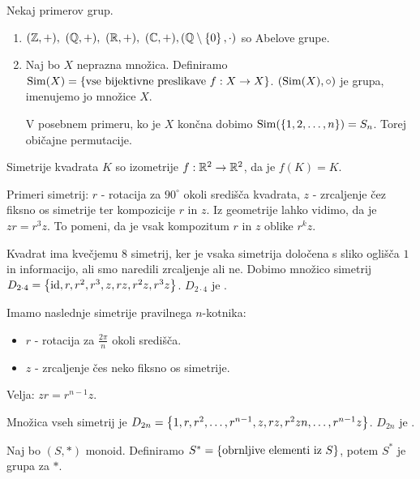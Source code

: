 \begin{zgled}
    Nekaj primerov grup.
    \begin{enumerate}
        \item $(\mathbb{Z}, +), \ (\mathbb{Q}, +), \ (\mathbb{R}, +), \ (\mathbb{C}, +), (\mathbb{Q} \setminus \left\{0\right\}, \cdot)$ so Abelove grupe.
        \item Naj bo $X$ neprazna množica. Definiramo $\operatorname{Sim}(X) = \left\{\text{vse bijektivne preslikave } f: X \to X\right\}$. $(\operatorname{Sim}(X), \circ)$ je grupa, imenujemo jo  množice $X$.        
        
        V posebnem primeru, ko je $X$ končna dobimo $\operatorname{Sim}(\left\{1, 2, \ldots, n\right\}) = S_n$. Torej običajne permutacije.
    \end{enumerate}
\end{zgled}

\begin{zgled}
    Simetrije kvadrata $K$ so izometrije $f: \mathbb{R}^2 \to \mathbb{R}^2$, da je $f(K) = K$. 
    
    Primeri simetrij: $r$ - rotacija za $90^{\circ}$ okoli središča kvadrata, $z$ - zrcaljenje čez fiksno os simetrije ter kompozicije $r$ in $z$. Iz geometrije lahko vidimo, da je $zr = r^3z$. To pomeni, da je vsak kompozitum $r$ in $z$ oblike $r^kz$.
    
    Kvadrat ima kvečjemu $8$ simetrij, ker je vsaka simetrija določena s sliko oglišča $1$ in informacijo, ali smo naredili zrcaljenje ali ne. Dobimo množico simetrij $D_{2 \cdot 4} = \left\{\operatorname{id}, r, r^2, r^3, z, rz, r^2z, r^3z\right\}$. $D_{2\cdot 4}$ je .
\end{zgled}

\begin{zgled}
    Imamo naslednje simetrije pravilnega $n$-kotnika:
    \begin{itemize}
        \item $r$ - rotacija za $\frac{2 \pi}{n}$ okoli središča.
        \item $z$ - zrcaljenje čes neko fiksno os simetrije.
    \end{itemize}
    Velja: $zr = r^{n-1}z$. 
    
    Množica vseh simetrij je $D_{2n} = \left\{1, r, r^2, \ldots, r^{n-1}, z, rz, r^2zn, \ldots, r^{n-1}z\right\}$. $D_{2n}$ je .
\end{zgled}

\begin{zgled}
    Naj bo $(S, *)$ monoid. Definiramo $S^* = \left\{\text{obrnljive elementi iz } S\right\}$, potem $S^*$ je grupa za $*$.
\end{zgled}


